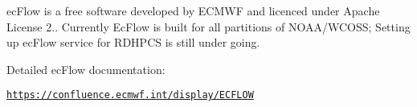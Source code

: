 ec\-Flow is a free software developed by E\-C\-M\-W\-F and licenced under Apache License 2.. Currently Ec\-Flow is built for all partitions of N\-O\-A\-A/\-W\-C\-O\-S\-S; Setting up ec\-Flow service for R\-D\-H\-P\-C\-S is still under going. \begin{DoxyVerb}Detailed ecFlow documentation: 
\end{DoxyVerb}


\href{https://confluence.ecmwf.int/display/ECFLOW}{\tt https\-://confluence.\-ecmwf.\-int/display/\-E\-C\-F\-L\-O\-W} 
